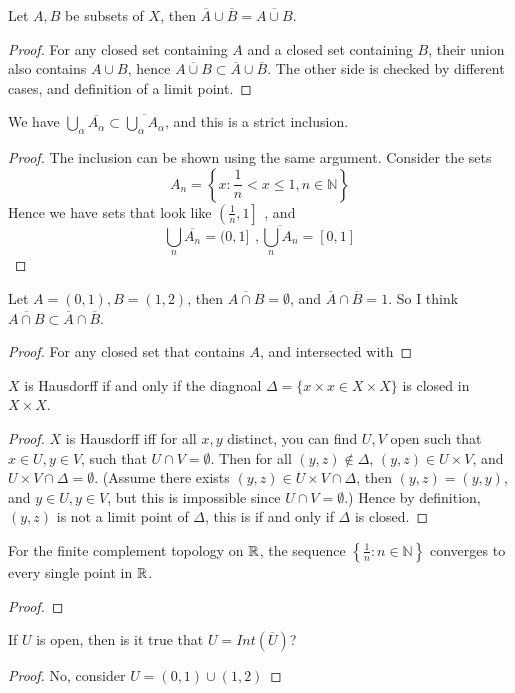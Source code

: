 \begin{prob}
    Let $A,B$ be subsets of $X$, then $\overline{A}\cup\overline{B}=\overline{A\cup B}$.
\end{prob}
\begin{proof}
    For any closed set containing $A$ and a closed set containing $B$, their union also contains $A\cup B$, hence $\overline{A\cup B}\subset\overline{A}\cup\overline{B}$. The other side is checked by different cases, and definition of a limit point.
\end{proof}
\begin{prob}
    We have $\bigcup_\alpha \overline{A_\alpha}\subset\overline{\bigcup_\alpha A_\alpha}$, and this is a strict inclusion.
\end{prob}
\begin{proof}
    The inclusion can be shown using the same argument. Consider the sets 
    \begin{equation*}
        A_n=\left\{x: \frac{1}{n}<x\leq 1, n\in\mathbb{N}\right\}
    \end{equation*}
    Hence we have sets that look like $\left(\frac{1}{n}, 1\right]\phantom{)}$, and 
    \begin{equation*}
        \bigcup_n\overline{A_n}=(0,1]\phantom{)}, \overline{\bigcup_nA_n}=[0,1]
    \end{equation*}
\end{proof}
\begin{prob}
    Let $A=(0,1), B=(1,2)$, then $\overline{A\cap B}=\emptyset$, and $\overline{A}\cap\overline{B}=1$. So I think $\overline{A\cap B}\subset\overline{A}\cap\overline{B}$. 
\end{prob}
\begin{proof}
    For any closed set that contains $A$, and intersected with 
\end{proof}

\begin{prob}
    $X$ is Hausdorff if and only if the diagnoal $\Delta=\{x\times x\in X\times X\}$ is closed in $X\times X$.
\end{prob}
\begin{proof}
    $X$ is Hausdorff iff for all $x,y$ distinct, you can find $U,V$ open such that $x\in U, y\in V$, such that $U\cap V=\emptyset$. Then for all $(y,z)\not\in\Delta$, $(y,z)\in U\times V$, and $U\times V\cap\Delta=\emptyset$. (Assume there exists $(y,z)\in U\times V\cap \Delta$, then $(y,z)=(y,y)$, and $y\in U, y\in V$, but this is impossible since $U\cap V=\emptyset$.) Hence by definition, $(y,z)$ is not a limit point of $\Delta$, this is if and only if $\Delta$ is closed.
\end{proof}
\begin{prob}
    For the finite complement topology on $\mathbb{R}$, the sequence $\left\{\frac{1}{n}:n\in\mathbb{N}\right\}$ converges to every single point in $\mathbb{R}$.
\end{prob}
\begin{proof}
    
\end{proof}

\begin{prob}
    If $U$ is open, then is it true that $U=Int(\overline{U})$?
\end{prob}
\begin{proof}
    No, consider $U=(0,1)\cup(1,2)$
\end{proof}